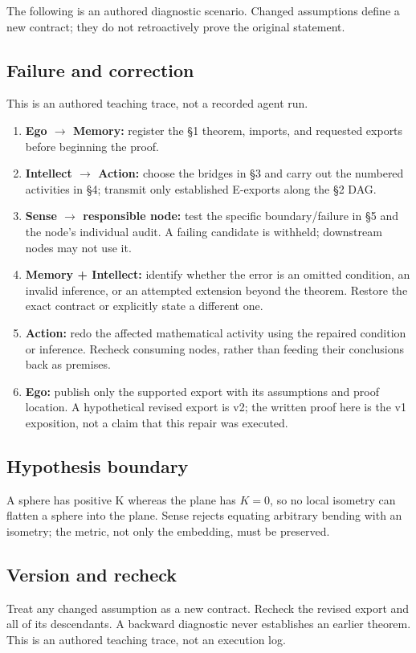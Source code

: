 \documentclass[preprint,12pt,aps,pra,showkeys,amsmath,amssymb,superscriptaddress,floatfix]{revtex4-2}
\theoremstyle{definition}
\theoremstyle{remark}
\providecommand{\tightlist}{\setlength{\itemsep}{2pt}\setlength{\parskip}{0pt}}
\begin{document}
The following is an authored diagnostic scenario. Changed assumptions
define a new contract; they do not retroactively prove the original
statement.

\subsection{Failure and correction}
This is an authored teaching trace, not a recorded agent run.

\begin{enumerate}
\def\labelenumi{\arabic{enumi}.}
\tightlist
\item
  \textbf{Ego \(\to\) Memory:} register the §1 theorem, imports, and
  requested exports before beginning the proof.
\item
  \textbf{Intellect \(\to\) Action:} choose the bridges in §3 and carry
  out the numbered activities in §4; transmit only established E-exports
  along the §2 DAG.
\item
  \textbf{Sense \(\to\) responsible node:} test the specific
  boundary/failure in §5 and the node's individual audit. A failing
  candidate is withheld; downstream nodes may not use it.
\item
  \textbf{Memory + Intellect:} identify whether the error is an omitted
  condition, an invalid inference, or an attempted extension beyond the
  theorem. Restore the exact contract or explicitly state a different
  one.
\item
  \textbf{Action:} redo the affected mathematical activity using the
  repaired condition or inference. Recheck consuming nodes, rather than
  feeding their conclusions back as premises.
\item
  \textbf{Ego:} publish only the supported export with its assumptions
  and proof location. A hypothetical revised export is v2; the written
  proof here is the v1 exposition, not a claim that this repair was
  executed.
\end{enumerate}

\subsection{Hypothesis boundary}
A sphere has positive K whereas the plane has \(K=0\), so no local
isometry can flatten a sphere into the plane. Sense rejects equating
arbitrary bending with an isometry; the metric, not only the embedding,
must be preserved.

\subsection{Version and recheck}
Treat any changed assumption as a new contract. Recheck the revised
export and all of its descendants. A backward diagnostic never
establishes an earlier theorem. This is an authored teaching trace, not
an execution log.
\end{document}
